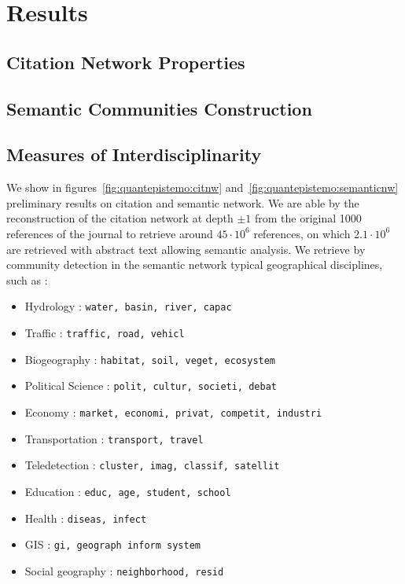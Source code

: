 \section{Results}



\subsection{Citation Network Properties}



\subsection{Semantic Communities Construction}




\subsection{Measures of Interdisciplinarity}




We show in figures~\ref{fig:quantepistemo:citnw} and~\ref{fig:quantepistemo:semanticnw} preliminary results on citation and semantic network. We are able by the reconstruction of the citation network at depth $\pm 1$ from the original 1000 references of the journal to retrieve around $45\cdot 10^6$ references, on which $2.1\cdot 10^6$ are retrieved with abstract text allowing semantic analysis. We retrieve by community detection in the semantic network typical geographical disciplines, such as :

\begin{itemize}
\item Hydrology : \texttt{water, basin, river, capac}
\item Traffic : \texttt{traffic, road, vehicl}
\item Biogeography : \texttt{habitat, soil, veget, ecosystem}
\item Political Science : \texttt{polit, cultur, societi, debat}
\item Economy : \texttt{market, economi, privat, competit, industri}
\item Transportation : \texttt{transport, travel}
\item Teledetection : \texttt{cluster, imag, classif, satellit}
\item Education : \texttt{educ, age, student, school}
\item Health : \texttt{diseas, infect}
\item GIS : \texttt{gi, geograph inform system}
\item Social geography : \texttt{neighborhood, resid}
\end{itemize}




